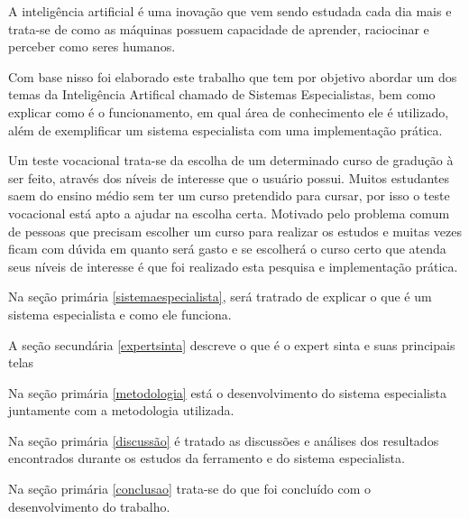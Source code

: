 A inteligência artificial é uma inovação que vem sendo estudada cada dia mais e trata-se de como as máquinas possuem capacidade de aprender, raciocinar e perceber como seres humanos.

Com base nisso foi elaborado este trabalho que tem por objetivo abordar um dos temas da Inteligência Artifical chamado de Sistemas Especialistas, bem como explicar como é o funcionamento, em qual área de conhecimento ele é utilizado, além de exemplificar um sistema especialista com uma implementação prática. 

Um teste vocacional trata-se da escolha de um determinado curso de gradução à ser feito, através dos níveis de interesse que o usuário possui. Muitos estudantes saem do ensino médio sem ter um curso pretendido para cursar, por isso o teste vocacional está apto a ajudar na escolha certa. Motivado pelo problema comum de pessoas que precisam escolher um curso para realizar os estudos e muitas vezes ficam com dúvida em quanto será gasto e se escolherá o curso certo que atenda seus níveis de interesse é que foi realizado esta pesquisa e implementação prática.

Na seção primária \ref{sistemaespecialista}, será tratrado de explicar o que é um sistema especialista e como ele funciona.

A seção secundária \ref{expertsinta} descreve o que é o expert sinta e suas principais telas

Na seção primária \ref{metodologia} está o desenvolvimento do sistema especialista juntamente com a metodologia utilizada.

Na seção primária \ref{discussão} é tratado as discussões e análises dos resultados encontrados durante os estudos da ferramento e do sistema especialista.

Na seção primária \ref{conclusao} trata-se do que foi concluído com o desenvolvimento do trabalho.